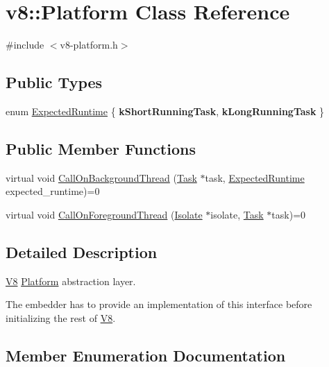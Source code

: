 \hypertarget{classv8_1_1_platform}{}\section{v8\+:\+:Platform Class Reference}
\label{classv8_1_1_platform}


{\ttfamily \#include $<$v8-\/platform.\+h$>$}

\subsection*{Public Types}
\begin{DoxyCompactItemize}
\item 
enum \hyperlink{classv8_1_1_platform_ace7f666b2b5995bb0e898e12fa660718}{Expected\+Runtime} \{ {\bfseries k\+Short\+Running\+Task}, 
{\bfseries k\+Long\+Running\+Task}
 \}
\end{DoxyCompactItemize}
\subsection*{Public Member Functions}
\begin{DoxyCompactItemize}
\item 
virtual void \hyperlink{classv8_1_1_platform_aa715e6839c1954b4e23b9d2df00bd3ea}{Call\+On\+Background\+Thread} (\hyperlink{classv8_1_1_task}{Task} $\ast$task, \hyperlink{classv8_1_1_platform_ace7f666b2b5995bb0e898e12fa660718}{Expected\+Runtime} expected\+\_\+runtime)=0
\item 
virtual void \hyperlink{classv8_1_1_platform_a8fa13959f919d1d3ff170bceea939915}{Call\+On\+Foreground\+Thread} (\hyperlink{classv8_1_1_isolate}{Isolate} $\ast$isolate, \hyperlink{classv8_1_1_task}{Task} $\ast$task)=0
\end{DoxyCompactItemize}


\subsection{Detailed Description}
\hyperlink{classv8_1_1_v8}{V8} \hyperlink{classv8_1_1_platform}{Platform} abstraction layer.

The embedder has to provide an implementation of this interface before initializing the rest of \hyperlink{classv8_1_1_v8}{V8}. 

\subsection{Member Enumeration Documentation}
\hypertarget{classv8_1_1_platform_ace7f666b2b5995bb0e898e12fa660718}{}
